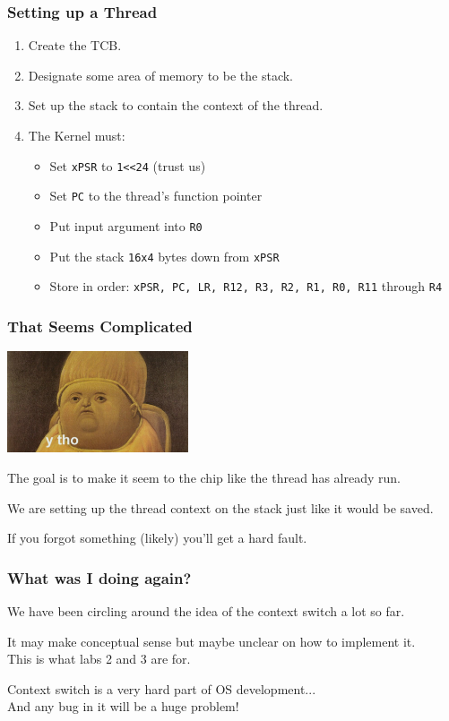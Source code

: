 \begin{frame}
\frametitle{Setting up a Thread}

\begin{enumerate}
	\item Create the TCB.
	\item Designate some area of memory to be the stack.
	\item Set up the stack to contain the context of the thread.
	\item The Kernel must:
		\begin{itemize}
			\item Set \texttt{xPSR} to \texttt{1<<24} (trust us)
			\item Set \texttt{PC} to the thread's function pointer
			\item Put input argument into \texttt{R0}
			\item Put the stack \texttt{16x4} bytes down from \texttt{xPSR}
			\item Store in order: \texttt{xPSR, PC, LR, R12, R3, R2, R1, R0, R11} through \texttt{R4}
		\end{itemize}
\end{enumerate}


\end{frame}


\begin{frame}
\frametitle{That Seems Complicated}

\begin{center}
	\includegraphics[width=0.4\textwidth]{images/ytho.jpg}
\end{center}

The goal is to make it seem to the chip like the thread has already run.

We are setting up the thread context on the stack just like it would be saved.

If you forgot something (likely) you'll get a hard fault.

\end{frame}


\begin{frame}
\frametitle{What was I doing again?}

We have been circling around the idea of the context switch a lot so far.

It may make conceptual sense but maybe unclear on how to implement it.\\
\quad This is what labs 2 and 3 are for.

Context switch is a very hard part of OS development...\\
\quad And any bug in it will be a huge problem!

\end{frame}


